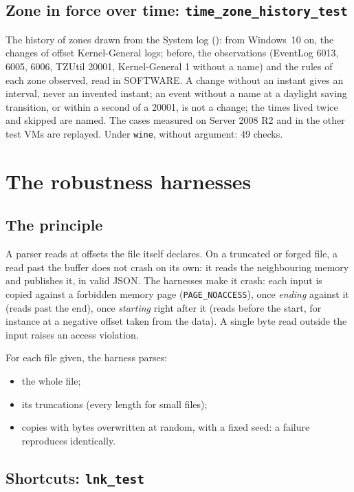 \documentclass[11pt,a4paper,oneside]{report}
\begin{document}
\section{Zone in force over time: \texttt{time\_zone\_history\_test}}

The history of zones drawn from the System log
(): from Windows~10 on, the changes of offset
Kernel-General logs; before, the observations (EventLog 6013, 6005, 6006,
TZUtil 20001, Kernel-General 1 without a name) and the rules of each zone
observed, read in SOFTWARE. A change without an instant gives an interval,
never an invented instant; an event without a name at a daylight saving
transition, or within a second of a 20001, is not a change; the times lived
twice and skipped are named. The cases measured on Server 2008 R2 and in the
other test VMs are replayed. Under \texttt{wine}, without argument: 49 checks.

\chapter{The robustness harnesses}\label{ch:robustesse}

\section{The principle}

A parser reads at offsets the file itself declares. On a truncated or forged
file, a read past the buffer does not crash on its own: it reads the
neighbouring memory and publishes it, in valid JSON. The harnesses make it
crash: each input is copied against a forbidden memory page
(\texttt{PAGE\_NOACCESS}), once \emph{ending} against it (reads past the end),
once \emph{starting} right after it (reads before the start, for instance at a
negative offset taken from the data). A single byte read outside the input
raises an access violation.

For each file given, the harness parses:
\begin{itemize}
  \item the whole file;
  \item its truncations (every length for small files);
  \item copies with bytes overwritten at random, with a fixed seed: a failure
    reproduces identically.
\end{itemize}

\section{Shortcuts: \texttt{lnk\_test}}
\end{document}
